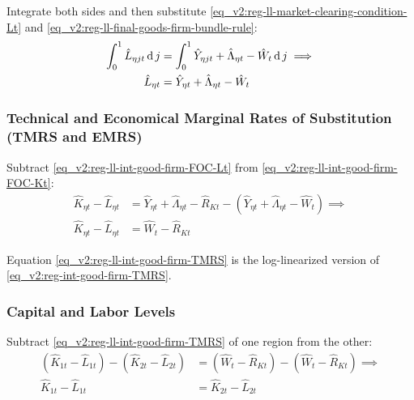 \documentclass[../thesis.tex]{subfiles}
\begin{document}
Integrate both sides and then substitute \ref{eq_v2:reg-ll-market-clearing-condition-Lt} and \ref{eq_v2:reg-ll-final-goods-firm-bundle-rule}:
\begin{align}
	\int_{0}^{1} \hat{L}_{\eta jt} \operatorname{d} j &= \int_{0}^{1} \hat{Y}_{\eta jt} + \hat{\Lambda}_{\eta t} - \hat{W}_{t} \operatorname{d} j \implies \nonumber \\
	\hat{L}_{\eta t} &= \hat{Y}_{\eta t} + \hat{\Lambda}_{\eta t} - \hat{W}_{t}
	\label{eq_v2:reg-ll-int-good-firm-FOC-Lt}
\end{align}


\subsubsection*{Technical and Economical Marginal Rates of Substitution (TMRS and EMRS)}

Subtract \ref{eq_v2:reg-ll-int-good-firm-FOC-Lt} from \ref{eq_v2:reg-ll-int-good-firm-FOC-Kt}:
\begin{align}
	\hat{K}_{\eta t} - \hat{L}_{\eta t} &= \hat{Y}_{\eta t} + \hat{\Lambda}_{\eta t} - \hat{R}_{K t} - (\hat{Y}_{\eta t} + \hat{\Lambda}_{\eta t} - \hat{W}_{t}) \implies \nonumber \\
	\hat{K}_{\eta t} - \hat{L}_{\eta t} &= \hat{W}_{t} - \hat{R}_{K t} \label{eq_v2:reg-ll-int-good-firm-TMRS}
\end{align}

Equation \ref{eq_v2:reg-ll-int-good-firm-TMRS} is the log-linearized version of \ref{eq_v2:reg-int-good-firm-TMRS}.


\begin{tcolorbox}[colback=red!5!white,colframe=red!75!black]

\subsubsection*{Capital and Labor Levels}
	
	Subtract \ref{eq_v2:reg-ll-int-good-firm-TMRS} of one region from the other:
	\begin{align}
		(\hat{K}_{1t} - \hat{L}_{1t}) - (\hat{K}_{2t} - \hat{L}_{2t}) &= (\hat{W}_{t} - \hat{R}_{K t}) - (\hat{W}_{t} - \hat{R}_{K t}) \implies \nonumber \\
		\hat{K}_{1t} - \hat{L}_{1t} &= \hat{K}_{2t} - \hat{L}_{2t} \label{eq_v2:reg-ll-int-good-firm-TMRS-b}
	\end{align}
	
\end{tcolorbox}
\end{document}
